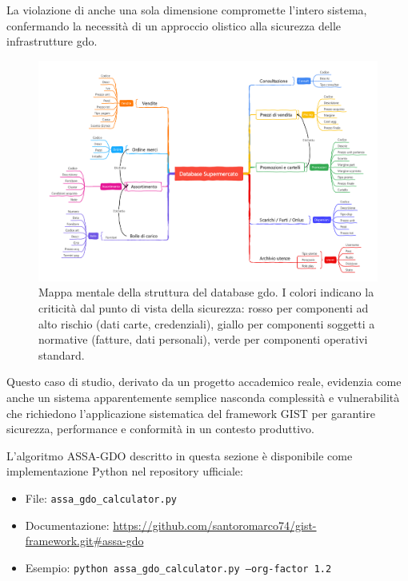 La violazione di anche una sola dimensione compromette l'intero sistema, confermando la necessità di un approccio olistico alla sicurezza delle infrastrutture \gls{gdo}.

\begin{figure}[htbp]
\centering
\includegraphics[width=\textwidth]{thesis_figures/cap2/DatabaseSupermercato.pdf}
\caption [Mappa mentale della struttura del database GDO.]{Mappa mentale della struttura del database \gls{gdo}. I colori indicano la criticità dal punto di vista della sicurezza: rosso per componenti ad alto rischio (dati carte, credenziali), giallo per componenti soggetti a normative (fatture, dati personali), verde per componenti operativi standard.}
\label{fig:database_mindmap}
\end{figure}

Questo caso di studio, derivato da un progetto accademico reale, evidenzia come anche un sistema apparentemente semplice nasconda complessità e vulnerabilità che richiedono l'applicazione sistematica del framework GIST per garantire sicurezza, performance e conformità in un contesto produttivo.

\begin{tcolorbox}[colback=blue!5!white,colframe=blue!75!black,title=Implementazione Disponibile]
L'algoritmo ASSA-GDO descritto in questa sezione è disponibile come implementazione Python nel repository ufficiale:
\begin{itemize}
    \item File: \texttt{assa\_gdo\_calculator.py}
    \item Documentazione: \url{https://github.com/santoromarco74/gist-framework.git#assa-gdo}
    \item Esempio: \texttt{python assa\_gdo\_calculator.py --org-factor 1.2}
\end{itemize}
\end{tcolorbox}

